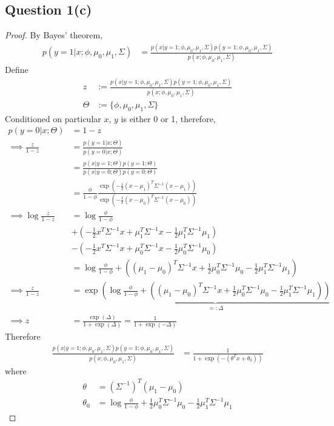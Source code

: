 \documentclass[11pt]{article}
\begin{document}
	\newpage
	\subsection{Question 1(c)}
	\begin{proof}
		By Bayes' theorem,
		\begin{align}
			p(y=1|x; \phi, \mu_0, \mu_1, \Sigma) &= \frac{p(x|y=1; \phi, \mu_0, \mu_1, \Sigma) p(y=1; \phi, \mu_0, \mu_1, \Sigma)}{p(x;\phi, \mu_0, \mu_1, \Sigma)}
		\end{align}
		Define 
		\begin{align}
			z &:= \frac{p(x|y=1; \phi, \mu_0, \mu_1, \Sigma) p(y=1; \phi, \mu_0, \mu_1, \Sigma)}{p(x;\phi, \mu_0, \mu_1, \Sigma)} \\
			\Theta &:= \{\phi, \mu_0, \mu_1, \Sigma\}
		\end{align}
		Conditioned on particular $x$, $y$ is either 0 or 1, therefore,
		\begin{align}
			p(y=0|x; \Theta) &= 1 - z \\
			\implies \frac{z}{1-z} &= \frac{p(y=1|x; \Theta)}{p(y=0|x; \Theta)} \\
			&= \frac{p(x|y=1; \Theta) p(y=1; \Theta)}{p(x|y=0; \Theta) p(y=0; \Theta)} \\
			&= \frac{\phi}{1 - \phi} \frac{\exp\left(-\frac{1}{2} (x-\mu_1)^T \Sigma^{-1} (x - \mu_1)\right)}{\exp\left(-\frac{1}{2} (x-\mu_0)^T \Sigma^{-1} (x - \mu_0)\right)} \\
			\implies \log \frac{z}{1-z} &= \log \frac{\phi}{1-\phi} \\
			&+ \left (-\frac{1}{2} x^T \Sigma^{-1} x + \mu_1^T \Sigma^{-1} x - \frac{1}{2} \mu_1^T \Sigma^{-1} \mu_1 \right) \\
			&- \left (-\frac{1}{2} x^T \Sigma^{-1} x + \mu_0^T \Sigma^{-1} x - \frac{1}{2} \mu_0^T \Sigma^{-1} \mu_0 \right) \\
			&= \log \frac{\phi}{1-\phi} + \left (
			(\mu_1 - \mu_0)^T \Sigma^{-1} x
			+ \frac{1}{2} \mu_0^T \Sigma^{-1} \mu_0 - \frac{1}{2} \mu_1^T \Sigma^{-1} \mu_1
			\right ) \\
			\implies \frac{z}{1-z} &= \exp \underbrace{\left (
			\log \frac{\phi}{1-\phi} + \left (
			(\mu_1 - \mu_0)^T \Sigma^{-1} x
			+ \frac{1}{2} \mu_0^T \Sigma^{-1} \mu_0 - \frac{1}{2} \mu_1^T \Sigma^{-1} \mu_1
			\right )
			\right )}_{=:\Delta} \\
			\implies z &= \frac{\exp(\Delta)}{1+\exp(\Delta)} = \frac{1}{1+\exp(-\Delta)}
		\end{align}
		Therefore
		\begin{align}
			\frac{p(x|y=1; \phi, \mu_0, \mu_1, \Sigma) p(y=1; \phi, \mu_0, \mu_1, \Sigma)}{p(x;\phi, \mu_0, \mu_1, \Sigma)}
			&= \frac{1}{1 + \exp(-(\theta^T x + \theta_0))}
		\end{align}
		where 
		\begin{align}
			\theta &= (\Sigma^{-1})^T (\mu_1 - \mu_0) \\
			\theta_0 &= \log \frac{\phi}{1-\phi} + \frac{1}{2} \mu_0^T \Sigma^{-1} \mu_0 - \frac{1}{2} \mu_1^T \Sigma^{-1} \mu_1
		\end{align}
	\end{proof}
	\newpage
\end{document}
